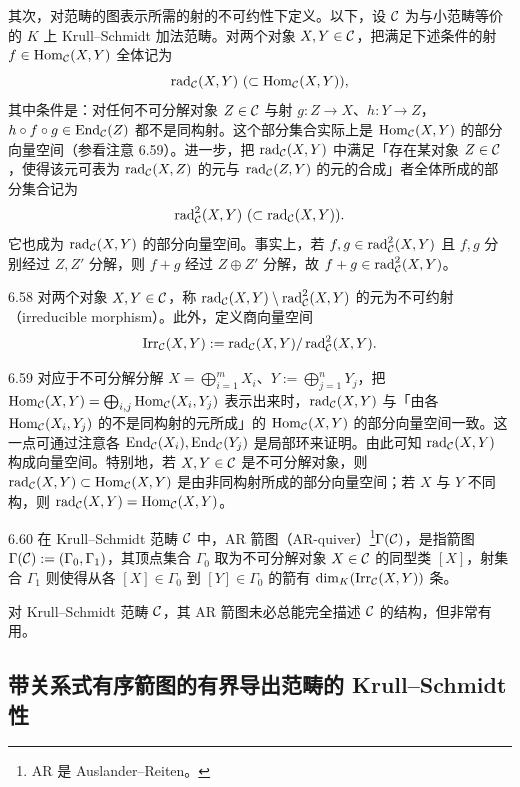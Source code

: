 其次，对范畴的图表示所需的射的不可约性下定义。以下，设 $\mathcal{C}$ 为与小范畴等价的 $K$ 上 Krull--Schmidt 加法范畴。对两个对象 $X,Y\in\mathcal{C}$，把满足下述条件的射 $f\in\operatorname{Hom}_{\mathcal{C}}(X,Y)$ 全体记为
\[
\rad_{\cC}(X,Y)\ (\subset\Hom_{\cC}(X,Y)),
\]
其中条件是：对任何不可分解对象 $Z\in\mathcal{C}$ 与射 $g\colon Z\to X$、$h\colon Y\to Z$，$h\circ f\circ g\in\operatorname{End}_{\mathcal{C}}(Z)$ 都不是同构射。这个部分集合实际上是 $\operatorname{Hom}_{\mathcal{C}}(X,Y)$ 的部分向量空间（参看注意 6.59）。进一步，把 $\operatorname{rad}_{\mathcal{C}}(X,Y)$ 中满足「存在某对象 $Z\in\mathcal{C}$，使得该元可表为 $\operatorname{rad}_{\mathcal{C}}(X,Z)$ 的元与 $\operatorname{rad}_{\mathcal{C}}(Z,Y)$ 的元的合成」者全体所成的部分集合记为
\[
\rad^{2}_{\cC}(X,Y)\ (\subset\rad_{\cC}(X,Y)).
\]
它也成为 $\operatorname{rad}_{\mathcal{C}}(X,Y)$ 的部分向量空间。事实上，若 $f,g\in\operatorname{rad}^{2}_{\mathcal{C}}(X,Y)$ 且 $f,g$ 分别经过 $Z,Z'$ 分解，则 $f+g$ 经过 $Z\oplus Z'$ 分解，故 $f+g\in\operatorname{rad}^{2}_{\mathcal{C}}(X,Y)$。

\begin{definition}{6.58}
对两个对象 $X,Y\in\mathcal{C}$，称 $\operatorname{rad}_{\mathcal{C}}(X,Y)\setminus\operatorname{rad}^{2}_{\mathcal{C}}(X,Y)$ 的元为不可约射（irreducible morphism）。此外，定义商向量空间
\[
\mathrm{Irr}_{\mathcal{C}}(X,Y):=\operatorname{rad}_{\mathcal{C}}(X,Y)/\operatorname{rad}^{2}_{\mathcal{C}}(X,Y).
\]
\end{definition}

\begin{remark}{6.59}
对应于不可分解分解 $X=\bigoplus_{i=1}^{m}X_i$、$Y:=\bigoplus_{j=1}^{n}Y_j$，把 $\operatorname{Hom}_{\mathcal{C}}(X,Y)=\bigoplus_{i,j}\operatorname{Hom}_{\mathcal{C}}(X_i,Y_j)$ 表示出来时，$\operatorname{rad}_{\mathcal{C}}(X,Y)$ 与「由各 $\operatorname{Hom}_{\mathcal{C}}(X_i,Y_j)$ 的不是同构射的元所成」的 $\operatorname{Hom}_{\mathcal{C}}(X,Y)$ 的部分向量空间一致。这一点可通过注意各 $\operatorname{End}_{\mathcal{C}}(X_i),\operatorname{End}_{\mathcal{C}}(Y_j)$ 是局部环来证明。由此可知 $\operatorname{rad}_{\mathcal{C}}(X,Y)$ 构成向量空间。特别地，若 $X,Y\in\mathcal{C}$ 是不可分解对象，则 $\operatorname{rad}_{\mathcal{C}}(X,Y)\subset\operatorname{Hom}_{\mathcal{C}}(X,Y)$ 是由非同构射所成的部分向量空间；若 $X$ 与 $Y$ 不同构，则 $\operatorname{rad}_{\mathcal{C}}(X,Y)=\operatorname{Hom}_{\mathcal{C}}(X,Y)$。
\end{remark}

\begin{definition}{6.60}
在 Krull--Schmidt 范畴 $\mathcal{C}$ 中，AR 箭图（AR-quiver）\footnote{AR 是 Auslander--Reiten。}$\Gamma(\mathcal{C})$，是指箭图 $\Gamma(\mathcal{C}):=(\Gamma_0,\Gamma_1)$，其顶点集合 $\Gamma_0$ 取为不可分解对象 $X\in\mathcal{C}$ 的同型类 $[X]$，射集合 $\Gamma_1$ 则使得从各 $[X]\in\Gamma_0$ 到 $[Y]\in\Gamma_0$ 的箭有 $\dim_K(\mathrm{Irr}_{\mathcal{C}}(X,Y))$ 条。
\end{definition}

对 Krull--Schmidt 范畴 $\mathcal{C}$，其 AR 箭图未必总能完全描述 $\mathcal{C}$ 的结构，但非常有用。

\subsection{带关系式有序箭图的有界导出范畴的 Krull--Schmidt 性}

